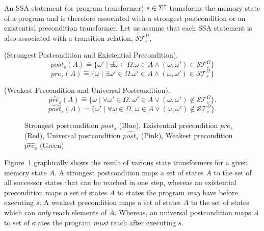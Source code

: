 An SSA statement (or program transformer) $s \in \Sigma^\dagger$ transforms the 
memory state of a program and is 
therefore associated with a strongest postcondition or an existential 
precondition transformer. Let us assume that each SSA statement is also 
associated with a transition relation, $\mathcal{ST}_{s}^{\Omega}$. 
%
\begin{definition} (Strongest Postcondition and Existential Precondition).
  \[
     post_{s}(A) \mathrel{\hat=} \{\omega' \mid \exists \omega \in
     \Omega. \omega \in A \wedge (\omega,\omega') \in \mathcal{ST}_{s}^{\Omega} \} 
  \] 
  \[ 
     pre_{s}(A) \mathrel{\hat=} \{\omega \mid \exists \omega' \in
     \Omega. \omega' \in A \wedge (\omega,\omega') \in \mathcal{ST}_{s}^{\Omega}\} 
  \]
\end{definition}
%
\begin{definition} (Weakest Precondition and Universal Postcondition). 
  \[
    \widehat{pre_s}(A) \mathrel{\hat=} \{\omega \mid \forall \omega' \in
    \Omega.\; \omega' \in A \vee (\omega,\omega') \not\in \mathcal{ST}_{s}^{\Omega} \}.
  \]
  \[ 
     \widehat{post_s}(A) \mathrel{\hat=} \{\omega' \mid \forall \omega \in
     \Omega.\; \omega \in A \vee (\omega,\omega') \not\in
     \mathcal{ST}_{s}^{\Omega} \}.
  \]
\end{definition}
%
%
\begin{figure}[t]
\centering
\vspace*{-0.2cm}
  \caption{Strongest postcondition $post_s$ (Blue), Existential precondition
  $pre_s$ (Red), Universal postcondition $\widehat{post_s}$ (Pink), 
  Weakest precondition $\widehat{pre_s}$ (Green)}
\label{state-transformer}
\end{figure}
%
Figure~\ref{state-transformer} graphically shows the result of various
state transformers for a given memory state $A$. A strongest postcondition 
maps a set of states $A$ to the set of all successor states that can be reached
in one step, whereas an existential precondition maps a set of states $A$ to
states the program \emph{may} have before executing $s$. A weakest precondition maps a set of states $A$ to the set
of states which can \emph{only} reach elements of $A$. Whereas, an universal
postcondition maps $A$ to set of states the program \emph{must} reach after
executing $s$.
%

